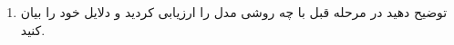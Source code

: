 \begin{enumerate}
\begin{qsolve}
	\end{qsolve}
	
	
	
	
	
	\item توضیح دهید در مرحله قبل با چه روشی مدل را ارزیابی کردید و دلایل خود را بیان کنید.
	\begin{qsolve}
		
	\end{qsolve}
	
	
	
\end{enumerate}


































